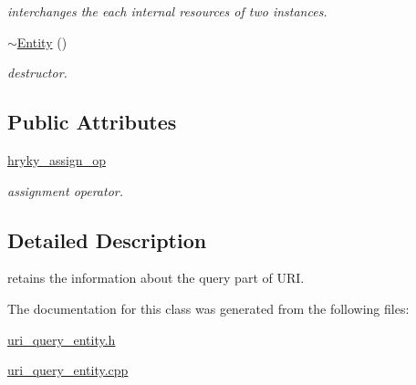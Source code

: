 \begin{DoxyCompactItemize}
\begin{DoxyCompactList}\small\item\em interchanges the each internal resources of two instances. \end{DoxyCompactList}\item 
\hypertarget{classhryky_1_1uri_1_1query_1_1_entity_ae8f69fb92a256a0779c519875a458a09}{\hyperlink{classhryky_1_1uri_1_1query_1_1_entity_ae8f69fb92a256a0779c519875a458a09}{$\sim$\-Entity} ()}\label{classhryky_1_1uri_1_1query_1_1_entity_ae8f69fb92a256a0779c519875a458a09}

\begin{DoxyCompactList}\small\item\em destructor. \end{DoxyCompactList}\end{DoxyCompactItemize}
\subsection*{Public Attributes}
\begin{DoxyCompactItemize}
\item 
\hypertarget{classhryky_1_1uri_1_1query_1_1_entity_a2ae62e94497faafbb1e1aa8ffe2daceb}{\hyperlink{classhryky_1_1uri_1_1query_1_1_entity_a2ae62e94497faafbb1e1aa8ffe2daceb}{hryky\-\_\-assign\-\_\-op}}\label{classhryky_1_1uri_1_1query_1_1_entity_a2ae62e94497faafbb1e1aa8ffe2daceb}

\begin{DoxyCompactList}\small\item\em assignment operator. \end{DoxyCompactList}\end{DoxyCompactItemize}


\subsection{Detailed Description}
retains the information about the query part of U\-R\-I. 

The documentation for this class was generated from the following files\-:\begin{DoxyCompactItemize}
\item 
\hyperlink{uri__query__entity_8h}{uri\-\_\-query\-\_\-entity.\-h}\item 
\hyperlink{uri__query__entity_8cpp}{uri\-\_\-query\-\_\-entity.\-cpp}\end{DoxyCompactItemize}
